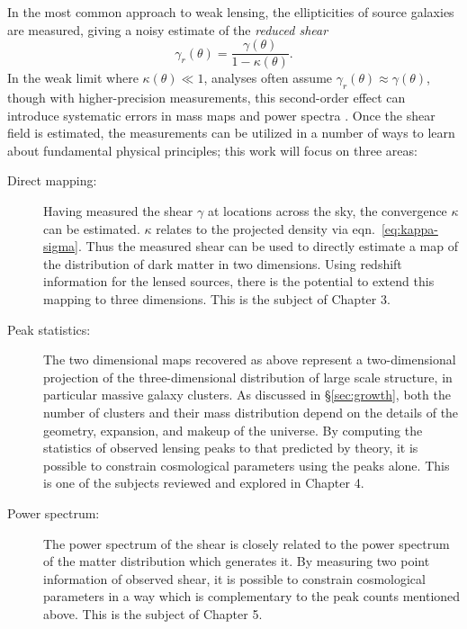 
In the most common approach to weak lensing,
the ellipticities of source galaxies are measured, 
giving a noisy estimate of the {\it reduced shear}
\begin{equation}
  \gamma_r(\theta) = \frac{\gamma(\theta)}{1 - \kappa(\theta)}.
\end{equation}
In the weak limit where $\kappa(\theta) \ll 1$, analyses often assume
$\gamma_r(\theta) \approx \gamma(\theta)$, though with higher-precision
measurements, this second-order effect can introduce systematic
errors in mass maps and power spectra \citep{Dodelson06, Shapiro09, Krause10}.
Once the shear field is estimated, the
measurements can be utilized in a number of ways to learn about
fundamental physical principles; this work will focus on three areas:
\begin{description}
  \item[Direct mapping:] Having measured the shear $\gamma$ at locations
    across the sky, the convergence $\kappa$ can be estimated.  $\kappa$
    relates to the projected density via eqn.~\ref{eq:kappa-sigma}.  Thus
    the measured shear can be used to directly estimate a map of the
    distribution of dark matter in two dimensions.  Using redshift
    information for the lensed sources, there is the potential to extend
    this mapping to three dimensions. This is the subject of Chapter 3.
  \item[Peak statistics:] The two dimensional maps recovered as above
    represent a two-dimensional projection of the three-dimensional
    distribution of large scale structure, in particular massive galaxy
    clusters.  As discussed in \S\ref{sec:growth}, both the number of
    clusters and their mass distribution depend on the details of the
    geometry, expansion, and makeup of the universe.  By computing the
    statistics of observed lensing peaks to 
    that predicted by theory, it is possible to
    constrain cosmological parameters using the peaks alone.  This is
    one of the subjects reviewed and explored in Chapter 4.
  \item[Power spectrum:] The power spectrum of the shear is closely related
    to the power spectrum of the matter distribution which generates it.
    By measuring two point information of observed shear, it is possible
    to constrain cosmological parameters in a way which is complementary
    to the peak counts mentioned above.  This is the subject of Chapter 5.
\end{description}

